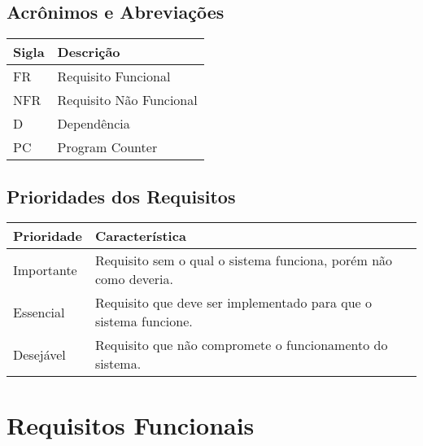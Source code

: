 \documentclass{article}
\begin{document}
	\subsection{Acrônimos e Abreviações}
	\FloatBarrier
	\begin{table}[H]
		\begin{center}
			\begin{tabular}[pos]{|m{2cm} | m{12cm}|} \hline
			\cellcolor[gray]{0.9}\textbf{Sigla} & \cellcolor[gray]{0.9}\textbf{Descrição} \\ \hline
		          FR      & Requisito Funcional  \\ \hline
		          NFR     & Requisito Não Funcional  \\ \hline
		          D       & Dependência  \\ \hline
				  PC      & Program Counter \\ \hline 
			\end{tabular}
		\end{center}
	\end{table}  
		
	\subsection{Prioridades dos Requisitos}
	\FloatBarrier
	\begin{table}[H]
		\begin{center}
			\begin{tabular}[pos]{|m{2cm} | m{12cm}|} \hline
			\cellcolor[gray]{0.9}\textbf{Prioridade} & \cellcolor[gray]{0.9}\textbf{Característica} \\ \hline
			Importante      & Requisito sem o qual o sistema funciona, porém não como deveria.  \\ \hline
			Essencial       & Requisito que deve ser implementado para que o sistema funcione.  \\ \hline
			Desejável       & Requisito que não compromete o funcionamento do sistema.  \\ \hline
			\end{tabular}
		\end{center}
	\end{table}  
		
\section{Requisitos Funcionais}
		
\end{document}
